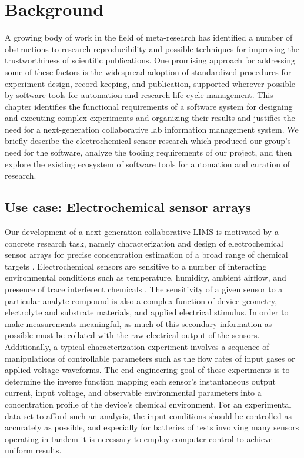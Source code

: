 \documentclass[../thesis]{subfiles}
\begin{document}
\chapter{Background}

A growing body of work in the field of meta-research has identified a
number of obstructions to research reproducibility and possible
techniques for improving the trustworthiness of scientific
publications. One promising approach for addressing some of these
factors is the widespread adoption of standardized procedures for
experiment design, record keeping, and publication, supported wherever
possible by software tools for automation and research life cycle
management. This chapter identifies the functional requirements of a
software system for designing and executing complex experiments and
organizing their results and justifies the need for a next-generation
collaborative lab information management system. We briefly describe
the electrochemical sensor research which produced our group's need
for the software, analyze the tooling requirements of our project, and
then explore the existing ecosystem of software tools for automation
and curation of research.



\section{Use case: Electrochemical sensor arrays}

Our development of a next-generation collaborative \gls{LIMS} is motivated
by a concrete research task, namely characterization and design of
electrochemical sensor arrays for precise concentration estimation of
a broad range of chemical targets \cite{Li2014, Wang2016,
  Wang2014}. Electrochemical sensors are sensitive to a number of
interacting environmental conditions such as temperature, humidity,
ambient airflow, and presence of trace interferent chemicals
\cite{Marco2012}. The sensitivity of a given sensor to a particular analyte compound is also
a complex function of device geometry, electrolyte and substrate
materials, and applied electrical stimulus. In order to make
measurements meaningful, as much of this secondary information as
possible must be collated with the raw electrical output of the
sensors. Additionally, a typical characterization experiment involves
a sequence of manipulations of controllable parameters such as the
flow rates of input gases or applied voltage waveforms. The end
engineering goal of these experiments is to determine the inverse
function mapping each sensor's instantaneous output current, input
voltage, and observable environmental parameters into a concentration
profile of the device's chemical environment. For an experimental data
set to afford such an analysis, the input conditions should be
controlled as accurately as possible, and especially for batteries of
tests involving many sensors operating in tandem it is necessary to
employ computer control to achieve uniform results.
\end{document}
